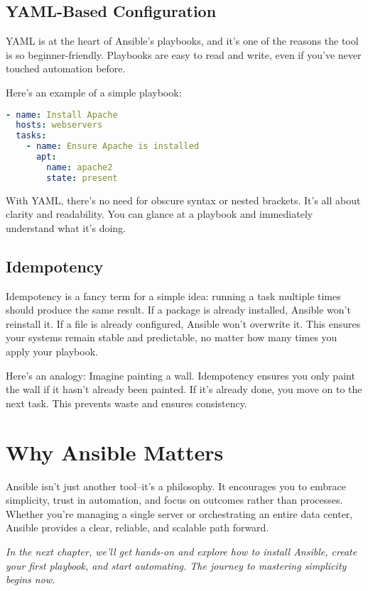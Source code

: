 \subsection{YAML-Based Configuration}

YAML is at the heart of Ansible's playbooks, and it's one of the reasons the tool is so beginner-friendly. Playbooks are easy to read and write, even if you've never touched automation before.

Here's an example of a simple playbook:
\begin{lstlisting}[language=yaml, caption=Example Playbook: Installing Apache]
- name: Install Apache
  hosts: webservers
  tasks:
    - name: Ensure Apache is installed
      apt:
        name: apache2
        state: present
\end{lstlisting}

With YAML, there's no need for obscure syntax or nested brackets. It's all about clarity and readability. You can glance at a playbook and immediately understand what it's doing.

\subsection{Idempotency}

Idempotency is a fancy term for a simple idea: running a task multiple times should produce the same result. If a package is already installed, Ansible won't reinstall it. If a file is already configured, Ansible won't overwrite it. This ensures your systems remain stable and predictable, no matter how many times you apply your playbook.

Here's an analogy: Imagine painting a wall. Idempotency ensures you only paint the wall if it hasn't already been painted. If it's already done, you move on to the next task. This prevents waste and ensures consistency.

\section{Why Ansible Matters}

Ansible isn't just another tool--it's a philosophy. It encourages you to embrace simplicity, trust in automation, and focus on outcomes rather than processes. Whether you're managing a single server or orchestrating an entire data center, Ansible provides a clear, reliable, and scalable path forward.

\vspace{1em}

\textit{In the next chapter, we'll get hands-on and explore how to install Ansible, create your first playbook, and start automating. The journey to mastering simplicity begins now.}
